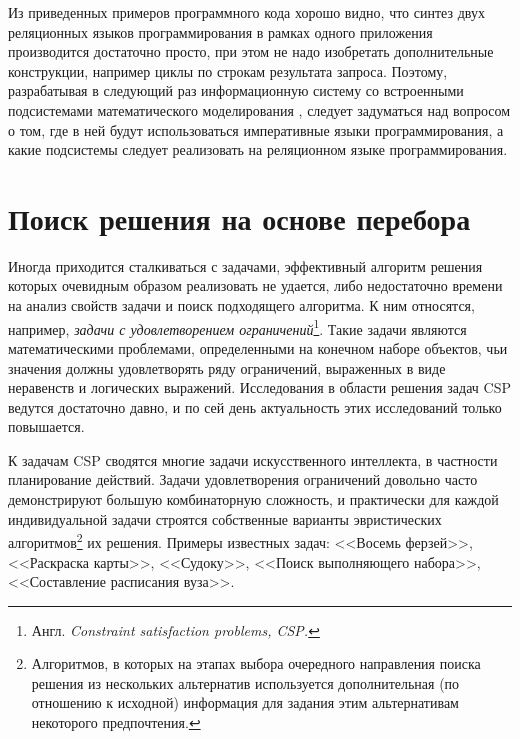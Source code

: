 \documentclass[a4paper,14pt, openany, twoside, draft]{extbook} %
\newcommand{\nnn}[2][ncolor]{\noindent%
\textcolor{eclr}{!\ [}\textcolor{#1}{#2}\textcolor{eclr}{]}}
\begin{document}
Из приведенных примеров программного кода хорошо видно, что синтез двух реляционных языков программирования в рамках одного приложения производится достаточно просто, при этом не надо изобретать дополнительные конструкции, например циклы по строкам результата запроса.  Поэтому, разрабатывая в следующий раз информационную систему со встроенными подсистемами математического моделирования \cite{asya2008}, следует задуматься над вопросом о том, где в ней будут использоваться императивные языки программирования, а какие подсистемы следует реализовать на реляционном языке программирования.



\chapter{Поиск решения на основе перебора} \label{sec:britmuseum}

Иногда приходится сталкиваться с задачами, эффективный алгоритм решения которых очевидным образом реализовать не удается, либо недостаточно времени на анализ свойств задачи и поиск подходящего алгоритма. К ним относятся, например, \emph{задачи с удовлетворением ограничений}\footnote{Англ. \emph{\foreignlanguage{english}{Constraint satisfaction problems}, CSP.}}. Такие задачи являются математическими проблемами, определенными на конечном наборе объектов, чьи значения должны удовлетворять ряду ограничений, выраженных в виде неравенств и логических выражений. Исследования в области решения задач CSP ведутся достаточно давно, и по сей день актуальность этих исследований только повышается.

К задачам CSP сводятся многие задачи искусственного интеллекта, в частности планирование действий. Задачи удовлетворения ограничений довольно часто демонстрируют большую комбинаторную сложность, и практически для каждой индивидуальной задачи строятся собственные варианты эвристических алгоритмов\footnote{Алгоритмов, в которых на этапах выбора очередного направления поиска решения из нескольких альтернатив используется дополнительная (по отношению к исходной) информация для задания этим альтернативам некоторого предпочтения.} их решения. Примеры известных задач: <<Восемь ферзей>>, <<Раскраска карты>>, <<Судоку>>, <<Поиск выполняющего набора>>, <<Составление расписания вуза>>.
\end{document}
